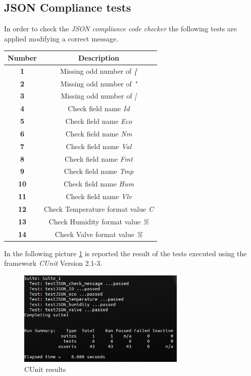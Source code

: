 \subsection{JSON Compliance  tests}
In order to check the \textit{JSON compliance code checker} the following tests are applied modifying a correct message.
\begin{center}
	\begin{tabular}{||c | c ||} 
		\hline
		Number			& 	Description \\ 
		\hline
		\textbf{1}		&	Missing odd number of \textit{\{}\\ 
		\hline
		\textbf{2}		&	Missing odd number of \textit{"}\\ 
		\hline
		\textbf{3}		&	Missing odd number of \textit{[}\\ 
		\hline
		\textbf{4}		&	Check field name \textit{Id} \\ 
		\hline
		\textbf{5}		&	Check field name \textit{Eco} \\ 
		\hline
		\textbf{6}		&	Check field name \textit{Nm} \\ 
		\hline
		\textbf{7}		&	Check field name \textit{Val} \\ 
		\hline
		\textbf{8}		&	Check field name \textit{Fmt} \\ 
		\hline
		\textbf{9}		&	Check field name \textit{Tmp} \\ 
		\hline
		\textbf{10}		&	Check field name \textit{Hum} \\ 
		\hline
		\textbf{11}		&	Check field name \textit{Vlv} \\ 
		\hline
		\textbf{12}		&	Check Temperature format value \textit{C} \\ 
		\hline
		\textbf{13}		&	Check Humidity format value \textit{\%} \\ 
		\hline
		\textbf{14}		&	Check Valve format value \textit{\%} \\ 
		\hline
	\end{tabular}
\end{center}

In the following picture \ref{fig:CUnit_result} is reported the result of the tests executed using the framework \textit{CUnit} Version 2.1-3.
\begin{figure}[H]
	\centering
	\includegraphics[width=8cm,keepaspectratio]{img/CUnit_result}
	\caption{CUnit results}
	\label{fig:CUnit_result}
\end{figure}


